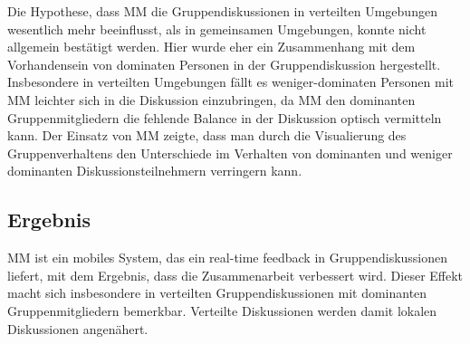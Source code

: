 Die Hypothese, dass MM die Gruppendiskussionen in verteilten Umgebungen
wesentlich mehr beeinflusst, als in gemeinsamen Umgebungen, konnte nicht
allgemein bestätigt werden. Hier wurde eher ein Zusammenhang mit dem
Vorhandensein von dominaten Personen in der Gruppendiskussion hergestellt.
Insbesondere in verteilten Umgebungen fällt es weniger-dominaten Personen mit
MM leichter sich in die Diskussion einzubringen, da MM den dominanten
Gruppenmitgliedern die fehlende Balance in der Diskussion optisch vermitteln
kann. 
Der Einsatz von MM zeigte, dass man durch die Visualierung des Gruppenverhaltens
den Unterschiede im Verhalten von dominanten und weniger dominanten
Diskussionsteilnehmern verringern kann.

\subsection{Ergebnis}
MM ist ein mobiles System, das ein real-time feedback in Gruppendiskussionen
liefert, mit dem Ergebnis, dass die Zusammenarbeit verbessert wird.
Dieser Effekt macht sich insbesondere in verteilten Gruppendiskussionen mit
dominanten Gruppenmitgliedern bemerkbar. Verteilte Diskussionen werden damit
lokalen Diskussionen angenähert.


